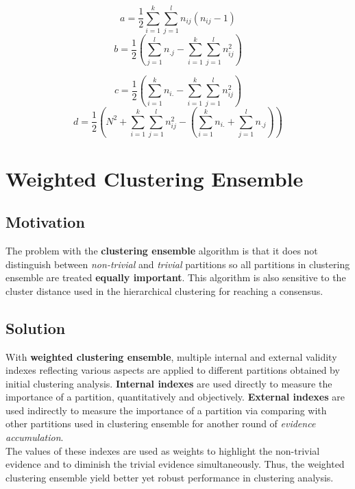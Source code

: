 \documentclass[11pt,fleqn]{book} %
\begin{document}
\begin{multicols}{2}
$$ a = \frac{1}{2}\sum^{k}_{i=1}\sum^{l}_{j=1}n_{ij}(n_{ij} - 1) $$
$$ b = \frac{1}{2}(\sum^{l}_{j=1}n_{.j} - \sum^{k}_{i=1}\sum^{l}_{j=1}n_{ij}^2)$$

$$ c = \frac{1}{2}(\sum^{k}_{i=1}n_{i.} - \sum^{k}_{i=1}\sum^{l}_{j=1}n_{ij}^2)$$
$$ d = \frac{1}{2}(N^2 + \sum^{k}_{i=1}\sum^{l}_{j=1}n_{ij}^2 - (\sum^{k}_{i=1}n_{i.} + \sum^{l}_{j=1}n_{.j}))$$
\end{multicols}

\section{Weighted Clustering Ensemble}
\subsection*{Motivation}
The problem with the \textbf{clustering ensemble} algorithm is that it does not distinguish between \textit{non-trivial} and \textit{trivial} partitions so all partitions in clustering ensemble are treated \textbf{equally important}. This algorithm is also sensitive to the cluster distance used in the hierarchical clustering for reaching a consensus.

\subsection*{Solution}
With \textbf{weighted clustering ensemble}, multiple internal and external validity indexes reflecting various aspects are applied to different partitions obtained by initial clustering analysis. \textbf{Internal indexes} are used directly to measure the importance of a partition, quantitatively and objectively. \textbf{External indexes} are used indirectly to measure the importance of a partition via comparing with other partitions used in clustering ensemble for another round of \textit{evidence accumulation}.\\

\noindent
The values of these indexes are used as weights to highlight the non-trivial evidence and to diminish the trivial evidence simultaneously. Thus, the weighted clustering ensemble yield better yet robust performance in clustering analysis.


\cleardoublepage
{}
\setlength{\columnsep}{0.75cm}
\printindex

\end{document}
